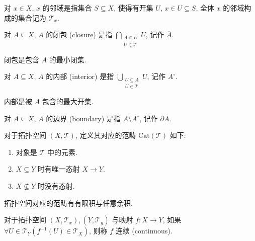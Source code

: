 \begin{definition}[邻域]
    对 \(x \in X\), \(x\) 的邻域是指集合 \(S \subseteq X\), 使得有开集 \(U\), \(x \in U \subseteq S\),
    全体 \(x\) 的邻域构成的集合记为 \(\mathcal{T}_x\).
\end{definition}

\begin{definition}[闭包]
    对 \(A \subseteq X\), \(A\) 的闭包 (closure) 是指 \(\bigcap_{\substack{A \subseteq U \\ U \in \mathcal{T}}} U\), 记作 \(\overline{A}\).
\end{definition}

闭包是包含 \(A\) 的最小闭集.

\begin{definition}[内部]
    对 \(A \subseteq X\), \(A\) 的内部 (interior) 是指 \(\bigcup_{\substack{U \subseteq A \\ U \in \mathcal{T}}} U\), 记作 \(A^\circ\).
\end{definition}

内部是被 \(A\) 包含的最大开集.

\begin{definition}[边界]
    对 \(A \subseteq X\), \(A\) 的边界 (boundary) 是指 \(\overline{A} \setminus A^\circ\), 记作 \(\partial A\).
\end{definition}

\begin{definition}
    \label {definition:topological space's category}
    对于拓扑空间 \((X,\mathcal{T})\), 定义其对应的范畴 \(\mathrm{Cat} (\mathcal{T})\) 如下:

    \begin{enumerate}
        \item 对象是 \(\mathcal{T}\) 中的元素.
        \item \(X \subseteq Y\) 时有唯一态射 \(X \to Y\).
        \item \(X \nsubseteq Y\) 时没有态射.
    \end{enumerate}
\end{definition}

\begin{lemma}
    拓扑空间对应的范畴有有限积与任意余积.
\end{lemma}

\begin{definition}
    对于拓扑空间 \((X,\mathcal{T}_x), (Y,\mathcal{T}_y)\) 与映射 \(f : X \to Y\),
    如果 \(\forall U \in \mathcal{T}_Y (f^{-1} (U) \in \mathcal{T}_X)\), 则称 \(f\) 连续 (continuous).
\end{definition}

